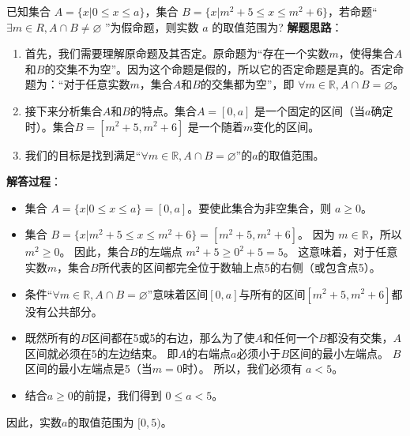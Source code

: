 \documentclass[CJKmath,a4paper,10pt]{ctexart}
\begin{document}
\begin{liti}
已知集合 $A=\{x|0\leq x\leq a\}$，集合 $B=\{ x|m^2+5\le x \le m^2+6\}$，若命题“ $\exists m\in R,A\cap B\neq\varnothing$ ”为假命题，则实数 $a$ 的取值范围为?
\tcblower\kaishu
\textbf{解题思路}：
\begin{enumerate}
    \item 首先，我们需要理解原命题及其否定。原命题为“存在一个实数$m$，使得集合$A$和$B$的交集不为空”。因为这个命题是假的，所以它的否定命题是真的。否定命题为：“对于任意实数$m$，集合$A$和$B$的交集都为空”，即 $\forall m \in \mathbb{R}, A \cap B = \varnothing$。
    \item 接下来分析集合$A$和$B$的特点。集合$A=[0, a]$ 是一个固定的区间（当$a$确定时）。集合$B=[m^2+5, m^2+6]$ 是一个随着$m$变化的区间。
    \item 我们的目标是找到满足“$\forall m \in \mathbb{R}, A \cap B = \varnothing$”的$a$的取值范围。
\end{enumerate}

\textbf{解答过程}：
\begin{itemize}
    \item 集合 $A = \{x|0 \le x \le a\} = [0, a]$。要使此集合为非空集合，则 $a \ge 0$。
    \item 集合 $B = \{x|m^2+5 \le x \le m^2+6\} = [m^2+5, m^2+6]$。
    因为 $m \in \mathbb{R}$，所以 $m^2 \ge 0$。
    因此，集合$B$的左端点 $m^2+5 \ge 0^2+5=5$。
    这意味着，对于任意实数$m$，集合$B$所代表的区间都完全位于数轴上点5的右侧（或包含点5）。
    \item 条件“$\forall m \in \mathbb{R}, A \cap B = \varnothing$”意味着区间$[0, a]$与所有的区间$[m^2+5, m^2+6]$都没有公共部分。
    \item 既然所有的$B$区间都在5或5的右边，那么为了使$A$和任何一个$B$都没有交集，$A$区间就必须在5的左边结束。
    即$A$的右端点$a$必须小于$B$区间的最小左端点。
    $B$区间的最小左端点是5（当$m=0$时）。
    所以，我们必须有 $a < 5$。
    \item 结合$a \ge 0$的前提，我们得到 $0 \le a < 5$。
\end{itemize}
因此，实数$a$的取值范围为 $[0, 5)$。
\end{liti}
\end{document}
